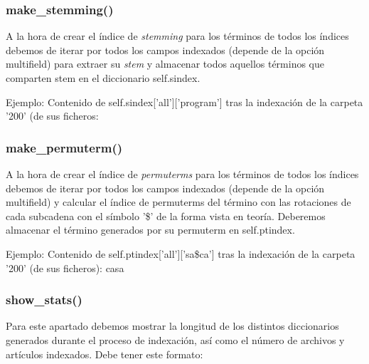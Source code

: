 \documentclass[12pt,a4paper]{article}
\begin{document}
\subsubsection{make\_stemming()}
A la hora de crear el índice de \textit{stemming} para los términos de todos los índices debemos de iterar por todos los campos indexados (depende de la opción multifield) para extraer su \textit{stem} y almacenar todos aquellos términos que comparten stem en el diccionario self.sindex.

Ejemplo: Contenido de self.sindex['all']['program'] tras la indexación de la carpeta '200' (de sus ficheros:


\subsubsection{make\_permuterm()}
A la hora de crear el índice de \textit{permuterms} para los términos de todos los índices debemos de iterar por todos los campos indexados (depende de la opción multifield) y calcular el índice de permuterms del término con las rotaciones de cada subcadena con el símbolo '\$' de la forma vista en teoría. Deberemos almacenar el término generados por su permuterm en self.ptindex.

Ejemplo: Contenido de self.ptindex['all']['sa\$ca'] tras la indexación de la carpeta '200' (de sus ficheros):
\newline
casa



\subsubsection{show\_stats()}
Para este apartado debemos mostrar la longitud de los distintos diccionarios generados durante el proceso de indexación, así como el número de archivos y artículos indexados. Debe tener este formato:
\end{document}
